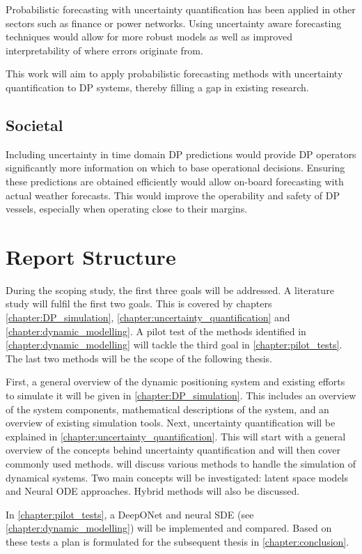 Probabilistic forecasting with uncertainty quantification has been applied in other sectors
such as finance or power networks. Using uncertainty aware forecasting techniques would allow for more robust models as
well as improved interpretability of where errors originate from.

This work will aim to apply probabilistic forecasting methods with uncertainty quantification to DP systems, thereby
filling a gap in existing research. 

\subsection{Societal}
Including uncertainty in time domain DP predictions would provide DP operators significantly more information on which
to base operational decisions. Ensuring these predictions are obtained efficiently would allow on-board forecasting with
actual weather forecasts. This would improve the operability and safety of DP vessels, especially when operating close
to their margins. 

\section{Report Structure}
\label{sec:report_structure}
During the scoping study, the first three goals will be addressed. A literature study will fulfil the first two goals.
This is covered by chapters \ref{chapter:DP_simulation}, \ref{chapter:uncertainty_quantification} and \ref{chapter:dynamic_modelling}.
A pilot test of the methods identified in \cref{chapter:dynamic_modelling} will tackle the third goal in \cref{chapter:pilot_tests}. The last two methods will be the scope of the
following thesis.

First, a general overview of the
dynamic positioning system and existing efforts to simulate it will be given in \cref{chapter:DP_simulation}. This
includes an overview of the system components, mathematical descriptions of the system, and an overview of existing
simulation tools. Next, uncertainty quantification will be explained in \cref{chapter:uncertainty_quantification}. This will start with a
general overview of the concepts behind uncertainty quantification and will then cover commonly used methods.  will discuss various methods to handle the simulation of dynamical systems. Two main
concepts will be investigated: latent space models and Neural ODE approaches. Hybrid methods will also be discussed. 

In \cref{chapter:pilot_tests}, a DeepONet and neural SDE (see \cref{chapter:dynamic_modelling}) will be implemented and
compared. Based on these tests a plan is formulated for the subsequent thesis in \cref{chapter:conclusion}. 